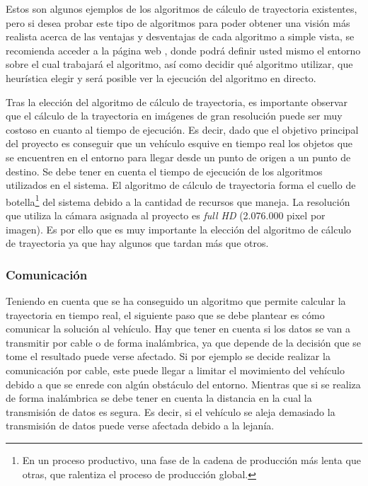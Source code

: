Estos son algunos ejemplos de los algoritmos de cálculo de trayectoria existentes, pero si desea probar este tipo de algoritmos para poder obtener una visión más realista acerca de las ventajas y desventajas de cada algoritmo a simple vista, se recomienda acceder a la página web \cite{Algoritmos}, donde podrá definir usted mismo el entorno sobre el cual trabajará el algoritmo, así como decidir qué algoritmo utilizar, que heurística elegir y será posible ver la ejecución del algoritmo en directo.

Tras la elección del algoritmo de cálculo de trayectoria, es importante observar que el cálculo de la trayectoria en imágenes de gran resolución puede ser muy costoso en cuanto al tiempo de ejecución. Es decir, dado que el objetivo principal del proyecto es conseguir que un vehículo esquive en tiempo real los objetos que se encuentren en el entorno para llegar desde un punto de origen a un punto de destino. Se debe tener en cuenta el tiempo de ejecución de los algoritmos utilizados en el sistema. El algoritmo de cálculo de trayectoria forma el cuello de botella\footnote{En un proceso productivo, una fase de la cadena de producción más lenta que otras, que ralentiza el proceso de producción global.} del sistema debido a la cantidad de recursos que maneja. La resolución que utiliza la cámara  asignada al proyecto es \emph{full HD} (2.076.000 pixel por imagen). Es por ello que es muy importante la elección del algoritmo de cálculo de trayectoria ya que hay algunos que tardan más que otros.

\subsubsection{Comunicación}

Teniendo en cuenta que se ha conseguido un algoritmo que permite calcular la trayectoria en tiempo real, el siguiente paso que se debe plantear es cómo comunicar la solución al vehículo. Hay que tener en cuenta si los datos se van a transmitir por cable o de forma inalámbrica, ya que depende de la decisión que se tome el resultado puede verse afectado. Si por ejemplo se decide realizar la comunicación por cable, este puede llegar a limitar el movimiento del vehículo debido a que se enrede con algún obstáculo del entorno. Mientras que si se realiza de forma inalámbrica se debe tener en cuenta la distancia en la cual la transmisión de datos es segura. Es decir, si el vehículo se aleja demasiado la transmisión de datos puede verse afectada debido a la lejanía.

